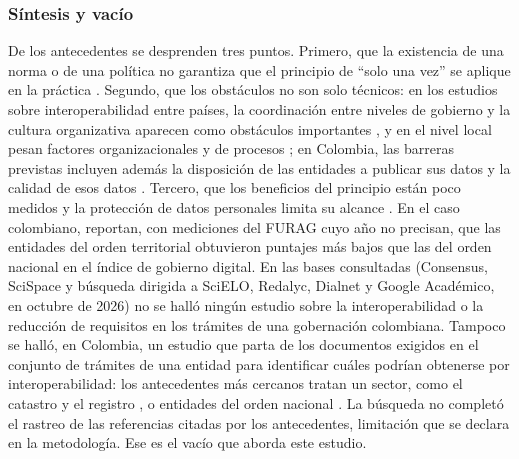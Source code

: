 \subsubsection{Síntesis y vacío}

De los antecedentes se desprenden tres puntos. Primero, que la existencia de una norma o de una política no garantiza que el principio de \enquote{solo una vez} se aplique en la práctica \parencites[p.~17]{mamrot2021implementation}[p.~78]{wimmer2021once}. Segundo, que los obstáculos no son solo técnicos: en los estudios sobre interoperabilidad entre países, la coordinación entre niveles de gobierno y la cultura organizativa aparecen como obstáculos importantes \parencites{criado2011interoperabilidad}[p.~38]{leosk2021drivers}, y en el nivel local pesan factores organizacionales y de procesos \parencite{bigdeli2013electronic}; en Colombia, las barreras previstas incluyen además la disposición de las entidades a publicar sus datos y la calidad de esos datos \parencite[p.~71]{moralesmoreno2015interoperability}. Tercero, que los beneficios del principio están poco medidos y la protección de datos personales limita su alcance \parencites[p.~208]{timan2021measuring}{mikiver2023gdpr}. En el caso colombiano, \textcite[p.~72]{marquezpinzon2023modelo} reportan, con mediciones del FURAG cuyo año no precisan, que las entidades del orden territorial obtuvieron puntajes más bajos que las del orden nacional en el índice de gobierno digital. En las bases consultadas (Consensus, SciSpace y búsqueda dirigida a SciELO, Redalyc, Dialnet y Google Académico, en octubre de 2026) no se halló ningún estudio sobre la interoperabilidad o la reducción de requisitos en los trámites de una gobernación colombiana. Tampoco se halló, en Colombia, un estudio que parta de los documentos exigidos en el conjunto de trámites de una entidad para identificar cuáles podrían obtenerse por interoperabilidad: los antecedentes más cercanos tratan un sector, como el catastro y el registro \parencite{pinzonarana2025caracterizacion}, o entidades del orden nacional \parencites{moralesmoreno2015interoperability}{molina2025propuesta} . La búsqueda no completó el rastreo de las referencias citadas por los antecedentes, limitación que se declara en la metodología. Ese es el vacío que aborda este estudio.

